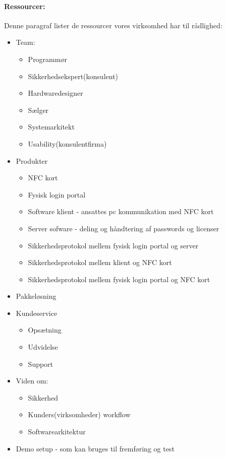 \paragraph{Ressourcer:}
Denne paragraf lister de ressourcer vores virksomhed har til rådlighed:
\begin{itemize}
\item Team:
  \begin{itemize}
  \item Programmør
  \item Sikkerhedsekspert(konsulent)
  \item Hardwaredesigner
  \item Sælger
  \item Systemarkitekt
  \item Usability(konsulentfirma)
  \end{itemize}
\item Produkter
  \begin{itemize}
  \item NFC kort
  \item Fysisk login portal
  \item Software klient - ansattes pc kommunikation med NFC kort
  \item Server sofware - deling og håndtering af passwords og licenser
  \item Sikkerhedsprotokol mellem fysisk login portal og server
  \item Sikkerhedsprotokol mellem klient og NFC kort
  \item Sikkerhedsprotokol mellem fysisk login portal og NFC kort
  \end{itemize}
\item Pakkeløsning
\item Kundeservice
  \begin{itemize}
  \item Opsætning
  \item Udvidelse
  \item Support
  \end{itemize}
\item Viden om:
  \begin{itemize}
  \item Sikkerhed
  \item Kunders(virksomheder) workflow
  \item Softwarearkitektur
  \end{itemize}
\item Demo setup - som kan bruges til fremføring og test
\end{itemize}
